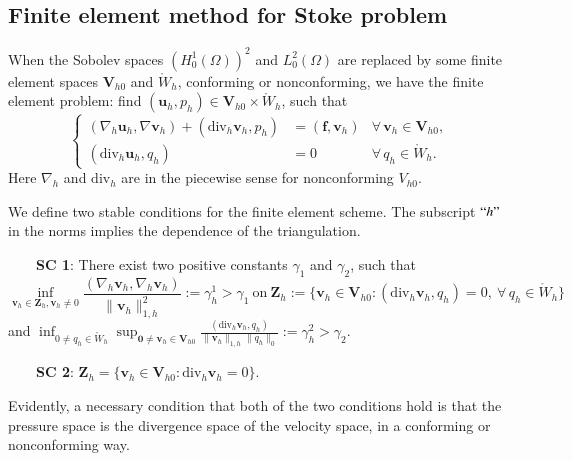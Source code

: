 \documentclass[12pt,showkeys]{amsart}
\begin{document}
\subsection{Finite element method for Stoke problem}

When the Sobolev spaces $(H^1_0(\Omega))^2$ and $L^2_0(\Omega)$ are replaced by some finite element spaces $\mathbf{V}_{h0}$ and $\mathring{W}_h$, conforming or nonconforming, we have the finite element problem: find $(\mathbf{u}_h,p_h)\in \mathbf{V}_{h0}\times \mathring{W}_h$, such that 
\begin{equation}\label{eq:stokesfep}
\left\{
\begin{array}{rll}
(\nabla_h\mathbf{u}_h,\nabla\mathbf{v}_h)+(\mathrm{div}_h\mathbf{v}_h,p_h)&=(\mathbf{f},\mathbf{v}_h) & \forall\,\mathbf{v}_h\in \mathbf{V}_{h0}, \\ 
(\mathrm{div}_h\mathbf{u}_h,q_h)&=0 & \forall\,q_h\in \mathring{W}_h.
\end{array}
\right.
\end{equation}
Here $\nabla_h$ and $\mathrm{div}_h$ are in the piecewise sense for nonconforming $V_{h0}$.

We define two stable conditions for the finite element scheme. The subscript $``h"$ in the norms implies the dependence of the triangulation.

~~~~\textbf{SC 1}: There exist two positive constants $\gamma_1$ and $\gamma_2$, such that
$$
\displaystyle\inf_{\mathbf{v}_h\in\mathbf{Z}_h,\mathbf{v}_h\neq0}\frac{(\nabla_h\mathbf{v}_h,\nabla_h\mathbf{v}_h)}{\|\mathbf{v}_h\|_{1,h}^2}:=\gamma_h^1>\gamma_1\ \mbox{on}\ \mathbf{Z}_h:=\{\mathbf{v}_h\in \mathbf{V}_{h0}:(\mathrm{div}_h\mathbf{v}_h,q_h)=0,\ \forall\,q_h\in \mathring{W}_h\}
$$ 
and $\displaystyle\inf_{0\neq q_h\in \mathring{W}_h}\sup_{\mathbf{0}\neq\mathbf{v}_h\in\mathbf{V}_{h0}}\frac{(\mathrm{div}_h\mathbf{v}_h,q_h)}{\|\mathbf{v}_h\|_{1,h}\|q_h\|_0}:=\gamma_h^2>\gamma_2$. 

~~~~\textbf{SC 2}: $\mathbf{Z}_h=\{\mathbf{v}_h\in\mathbf{V}_{h0}:\mathrm{div}_h\mathbf{v}_h=0\}$.

Evidently, a necessary condition that both of the two conditions hold is that the pressure space is the divergence space of the velocity space, in a conforming or nonconforming way.  
\end{document}
